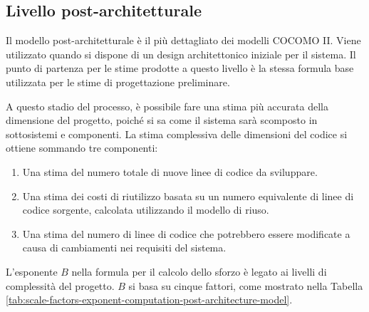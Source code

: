 \subsection{Livello post-architetturale}
Il modello post-architetturale è il più dettagliato dei modelli COCOMO II. Viene utilizzato quando si dispone di un design architettonico iniziale per il sistema. Il punto di partenza per le stime prodotte a questo livello è la stessa formula base utilizzata per le stime di progettazione preliminare.

A questo stadio del processo, è possibile fare una stima più accurata della dimensione del progetto, poiché si sa come il sistema sarà scomposto in sottosistemi e componenti. La stima complessiva delle dimensioni del codice si ottiene sommando tre componenti:
\begin{enumerate}
    \item Una stima del numero totale di nuove linee di codice da sviluppare.
    \item Una stima dei costi di riutilizzo basata su un numero equivalente di linee di codice sorgente, calcolata utilizzando il modello di riuso.
    \item Una stima del numero di linee di codice che potrebbero essere modificate a causa di cambiamenti nei requisiti del sistema.
\end{enumerate}
L'esponente $B$ nella formula per il calcolo dello sforzo è legato ai livelli di complessità del progetto. $B$ si basa su cinque fattori, come mostrato nella Tabella \ref{tab:scale-factors-exponent-computation-post-architecture-model}.

